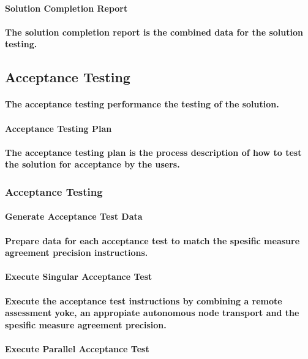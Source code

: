 \documentclass{acm_proc_article-sp}
\begin{document}
\paragraph{Solution Completion Report}
\paragraph{The solution completion report is the combined data for the solution testing.}
\subsection{Acceptance Testing}
\paragraph{The acceptance testing performance the testing of the solution.}
\paragraph{Acceptance Testing Plan}
\paragraph{The acceptance testing plan is the process description of how to test the solution for acceptance by the users.}
\subsubsection{Acceptance Testing}
\paragraph{Generate Acceptance Test Data}
\paragraph{Prepare data for each acceptance test to match the spesific measure agreement precision instructions.}
\paragraph{Execute Singular Acceptance Test}
\paragraph{Execute the acceptance test instructions by combining a remote assessment yoke, an appropiate autonomous node transport and the spesific measure agreement precision.}
\paragraph{Execute Parallel Acceptance Test}
\end{document}
